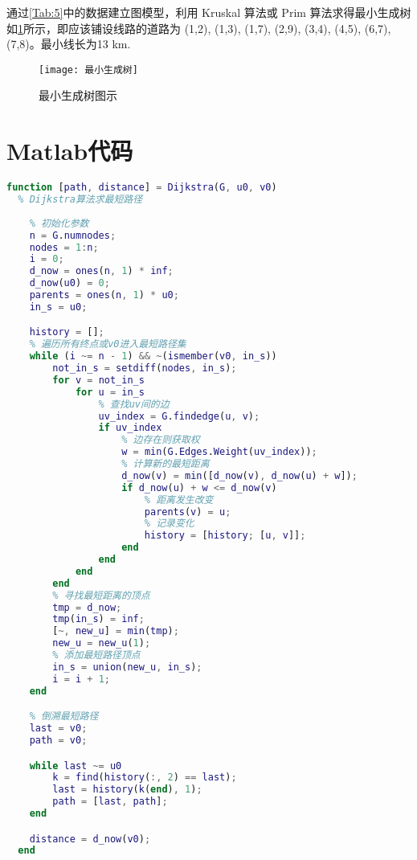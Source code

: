 \documentclass[withoutpreface]{cumcmthesis}
\begin{document}
通过\cref{Tab:5}中的数据建立图模型，利用 Kruskal 算法或 Prim 算法求得最小生成树如\cref{Fig:8}所示，即应该铺设线路的道路为 (1,2), (1,3), (1,7), (2,9), (3,4), (4,5), (6,7), (7,8)。最小线长为13 km. 

\begin{figure}[H]
  \centering
  \texttt{[image: 最小生成树]}
  \vspace{-0.2cm}
  \caption{最小生成树图示}\label{Fig:8}
\end{figure}

\appendix
\section{Matlab代码}
  \begin{lstlisting}[language=matlab ,caption={Dijkstra算法} ]
  function [path, distance] = Dijkstra(G, u0, v0)
  % Dijkstra算法求最短路径
  
    % 初始化参数
    n = G.numnodes;
    nodes = 1:n;
    i = 0;
    d_now = ones(n, 1) * inf;
    d_now(u0) = 0;
    parents = ones(n, 1) * u0;
    in_s = u0;

    history = [];
    % 遍历所有终点或v0进入最短路径集
    while (i ~= n - 1) && ~(ismember(v0, in_s))
        not_in_s = setdiff(nodes, in_s);
        for v = not_in_s
            for u = in_s
                % 查找uv间的边
                uv_index = G.findedge(u, v);
                if uv_index
                    % 边存在则获取权
                    w = min(G.Edges.Weight(uv_index));
                    % 计算新的最短距离
                    d_now(v) = min([d_now(v), d_now(u) + w]);
                    if d_now(u) + w <= d_now(v)
                        % 距离发生改变
                        parents(v) = u;
                        % 记录变化
                        history = [history; [u, v]];
                    end
                end
            end
        end
        % 寻找最短距离的顶点
        tmp = d_now;
        tmp(in_s) = inf;
        [~, new_u] = min(tmp);
        new_u = new_u(1);
        % 添加最短路径顶点
        in_s = union(new_u, in_s);
        i = i + 1;
    end

    % 倒溯最短路径
    last = v0;
    path = v0;

    while last ~= u0
        k = find(history(:, 2) == last);
        last = history(k(end), 1);
        path = [last, path];
    end

    distance = d_now(v0);
  end
  \end{lstlisting}
\end{document}
